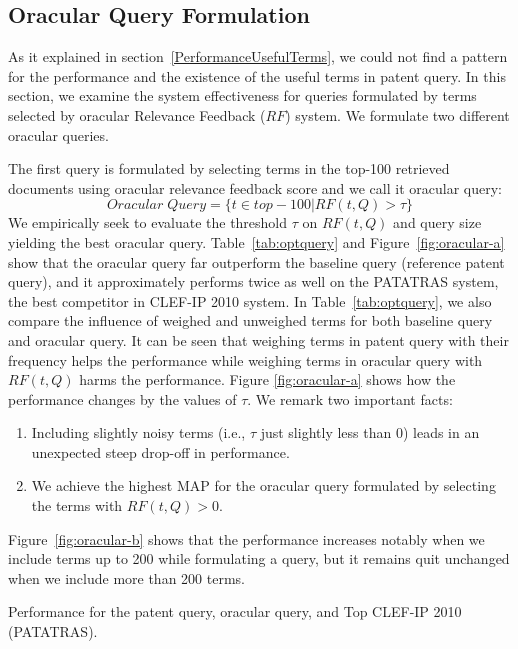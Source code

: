 \subsection{Oracular Query Formulation}
\label{sec:OracularQueryFormulation}
As it explained in section~\ref{PerformanceUsefulTerms}, we could not find a pattern for the performance and the existence of the useful terms in patent query.
In this section, we examine the system effectiveness for queries formulated by terms selected by oracular Relevance Feedback ($\mathit{RF}$) system.
We formulate two different oracular queries.

The first query is formulated by selecting terms in the top-100 retrieved documents using oracular relevance feedback score and we call it oracular query:
\begin{equation}
Oracular \; Query = \{t \in top-100|RF(t, Q)>\tau\}   
 \label{eq:score}
\end{equation}
We empirically seek to evaluate the threshold $\tau$ on $RF(t,Q)$ and query size yielding the best oracular query.
Table~\ref{tab:optquery} and Figure~\ref{fig:oracular-a} show that the oracular query far outperform the baseline query (reference patent query), and it approximately performs twice as well on the PATATRAS system, the best competitor in CLEF-IP 2010 system. In Table~\ref{tab:optquery}, we also compare the influence of weighed and unweighed terms for both baseline query and oracular query. It can be seen that weighing terms in patent query with their frequency helps the performance while weighing terms in oracular query with $RF(t, Q)$ harms the performance. 
Figure \ref{fig:oracular-a} shows how the performance changes by the values of $\tau$. We remark two important facts: 
\begin{enumerate}
\item Including slightly noisy terms (i.e., $\tau$ just slightly less than 0) leads in an unexpected steep drop-off in performance.  
\item We achieve the highest MAP for the oracular query formulated by selecting the terms with $RF(t, Q)>0$.
\end{enumerate}
Figure~\ref{fig:oracular-b} shows that the performance increases notably when we include terms up to 200 while formulating a query, but it remains quit unchanged when we include more than 200 terms. 
\begin{table}[t!]
  \begin{center}
  \scriptsize
   \caption{Performance for the patent query, oracular query, and Top CLEF-IP 2010 (PATATRAS).}
   \vspace*{1ex}
     
  \label{tab:optquery}
  \end{center}  
\end{table}
